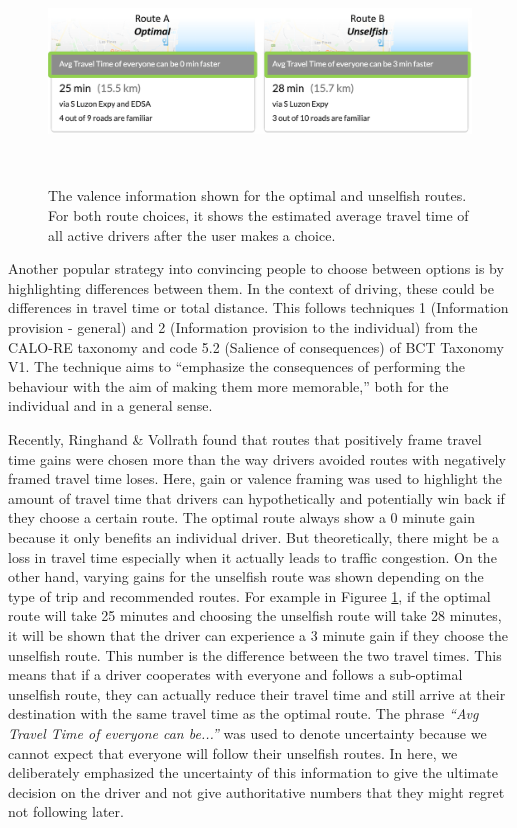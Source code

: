\begin{figure}[h]
\centering
  \includegraphics[scale=0.4]{figures/s3-valence.png}
  \caption{The valence information shown for the optimal and unselfish routes. For both route choices, it shows the estimated average travel time of all active drivers after the user makes a choice.}~\label{fig:s3-valence}
\end{figure}

Another popular strategy into convincing people to choose between options is by highlighting differences between them. In the context of driving, these could be differences in travel time or total distance. This follows techniques 1 (Information provision - general) and 2 (Information provision to the individual) from the CALO-RE taxonomy\cite{michie2011refined} and code 5.2 (Salience of consequences) of BCT Taxonomy V1\cite{michie2013behavior}. The technique aims to ``emphasize the consequences of performing the behaviour with the aim of making them more memorable,''\cite{michie2013behavior} both for the individual and in a general sense. 

Recently, Ringhand \& Vollrath\cite{ringhand2019faster} found that routes that positively frame travel time gains were chosen more than the way drivers avoided routes with negatively framed travel time loses. Here, gain or valence framing was used to highlight the amount of travel time that drivers can hypothetically and potentially win back if they choose a certain route. The optimal route always show a 0 minute gain because it only benefits an individual driver. But theoretically, there might be a loss in travel time especially when it actually leads to traffic congestion. On the other hand, varying gains for the unselfish route was shown depending on the type of trip and recommended routes. For example in Figuree \ref{fig:s3-valence}, if the optimal route will take 25 minutes and choosing the unselfish route will take 28 minutes, it will be shown that the driver can experience a 3 minute gain if they choose the unselfish route. This number is the difference between the two travel times. This means that if a driver cooperates with everyone and follows a sub-optimal unselfish route, they can actually reduce their travel time and still arrive at their destination with the same travel time as the optimal route. The phrase \textit{``\textit{Avg Travel Time of everyone can be...}''} was used to denote uncertainty because we cannot expect that everyone will follow their unselfish routes. In here, we deliberately emphasized the uncertainty of this information to give the ultimate decision on the driver and not give authoritative numbers that they might regret not following later. 

